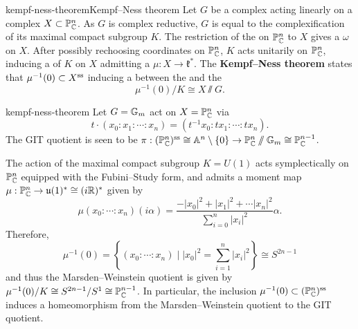     

\begin{topic}{kempf-ness-theorem}{Kempf--Ness theorem}
    Let $G$ be a complex  acting linearly on a  complex  $X \subset \mathbb{P}^n_{\mathbb{C}}$.
    As $G$ is complex reductive, $G$ is equal to the complexification of its maximal compact subgroup $K$. The restriction of the  on $\mathbb{P}^n_{\mathbb{C}}$ to $X$ gives a  $\omega$ on $X$.
    After possibly rechoosing coordinates on $\mathbb{P}^n_{\mathbb{C}}$, $K$ acts unitarily on $\mathbb{P}^n_{\mathbb{C}}$, inducing a  of $K$ on $X$ admitting a  $\mu : X \to \mathfrak{k}^*$. %
    The \textbf{Kempf--Ness theorem} states that
    $\mu^{-1}(0) \subset X^\textup{ss}$ inducing a  between the  and the 
    \[ \mu^{-1}(0) / K \cong X \sslash G . \]
\end{topic}

\begin{example}{kempf-ness-theorem}
    Let $G = \mathbb{G}_m$ act on $X = \mathbb{P}^n_{\mathbb{C}}$ via
    \[ t \cdot (x_0 : x_1 : \cdots : x_n) = (t^{-1} x_0 : t x_1 : \cdots : t x_n) . \]
    The GIT quotient is seen to be $\pi : (\mathbb{P}^n_{\mathbb{C}})^\textup{ss} \cong \mathbb{A}^n \setminus \{ 0 \} \to \mathbb{P}^n_{\mathbb{C}} \sslash \mathbb{G}_m \cong \mathbb{P}^{n - 1}_{\mathbb{C}}$.
    
    The action of the maximal compact subgroup $K = U(1)$ acts symplectically on $\mathbb{P}^n_{\mathbb{C}}$ equipped with the Fubini--Study form, and admits a moment map $\mu : \mathbb{P}^n_{\mathbb{C}} \to \mathfrak{u}(1)^* \cong (i \mathbb{R})^*$ given by
    \[ \mu(x_0 : \cdots : x_n)(i \alpha) = \frac{-|x_0|^2 + |x_1|^2 + \cdots |x_n|^2}{\sum_{i = 0}^{n} |x_i|^2} \alpha . \]
    Therefore,
    \[ \mu^{-1}(0) = \left\{ (x_0 : \cdots : x_n) \mid |x_0|^2 = \sum_{i = 1}^{n} |x_i|^2 \right\} \cong S^{2n - 1} \]
    and thus the Marsden--Weinstein quotient is given by $\mu^{-1}(0) / K \cong S^{2n - 1} / S^1 \cong \mathbb{P}^{n - 1}_{\mathbb{C}}$. In particular, the inclusion $\mu^{-1}(0) \subset (\mathbb{P}^n_{\mathbb{C}})^\textup{ss}$ induces a homeomorphism from the Marsden--Weinstein quotient to the GIT quotient.
\end{example}

